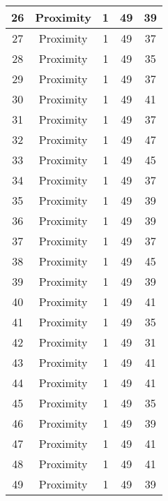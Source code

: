 \documentclass[results.tex]{subfiles}
\begin{document}
\begin{center}
\begin{tabular}{| c || c | c | c | c |}
    \hline
    26 & Proximity & 1 & 49 & 39 \\ 
    \hline
    27 & Proximity & 1 & 49 & 37 \\ 
    \hline
    28 & Proximity & 1 & 49 & 35 \\ 
    \hline
    29 & Proximity & 1 & 49 & 37 \\ 
    \hline
    30 & Proximity & 1 & 49 & 41 \\ 
    \hline
    31 & Proximity & 1 & 49 & 37 \\ 
    \hline
    32 & Proximity & 1 & 49 & 47 \\ 
    \hline
    33 & Proximity & 1 & 49 & 45 \\ 
    \hline
    34 & Proximity & 1 & 49 & 37 \\ 
    \hline
    35 & Proximity & 1 & 49 & 39 \\ 
    \hline
    36 & Proximity & 1 & 49 & 39 \\ 
    \hline
    37 & Proximity & 1 & 49 & 37 \\ 
    \hline
    38 & Proximity & 1 & 49 & 45 \\ 
    \hline
    39 & Proximity & 1 & 49 & 39 \\ 
    \hline
    40 & Proximity & 1 & 49 & 41 \\ 
    \hline
    41 & Proximity & 1 & 49 & 35 \\ 
    \hline
    42 & Proximity & 1 & 49 & 31 \\ 
    \hline
    43 & Proximity & 1 & 49 & 41 \\ 
    \hline
    44 & Proximity & 1 & 49 & 41 \\ 
    \hline
    45 & Proximity & 1 & 49 & 35 \\ 
    \hline
    46 & Proximity & 1 & 49 & 39 \\ 
    \hline
    47 & Proximity & 1 & 49 & 41 \\ 
    \hline
    48 & Proximity & 1 & 49 & 41 \\ 
    \hline
    49 & Proximity & 1 & 49 & 39 \\ 
    \hline   \end{tabular}
\end{center}
\end{document}
